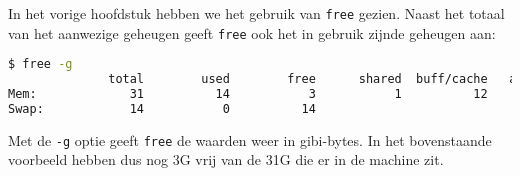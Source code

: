 In het vorige hoofdstuk hebben we het gebruik van \texttt{free} gezien. Naast het totaal van het aanwezige geheugen geeft \texttt{free} ook het in gebruik zijnde geheugen aan:
\begin{lstlisting}[language=bash]
$ free -g
              total        used        free      shared  buff/cache   available
Mem:             31          14           3           1          12          13
Swap:            14           0          14
\end{lstlisting}
Met de \texttt{-g} optie geeft \texttt{free} de waarden weer in gibi-bytes. In het bovenstaande voorbeeld hebben dus nog 3G vrij van de 31G die er in de machine zit.

